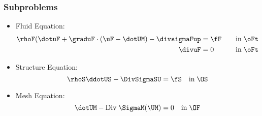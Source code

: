 \begin{frame}
 \frametitle{Subproblems}
   \begin{itemize}[<+->]
  \item
    Fluid Equation:
    \begin{equation*}
      \begin{aligned}
        \rhoF(\dotuF + \graduF \cdot (\uF - \dotUM) - \divsigmaFup &= \fF \quad &\textrm{in}\; \oFt \\
        \divuF &= 0 \quad  &\textrm{in} \;\oFt
      \end{aligned}
    \end{equation*}
    
   \item
    Structure Equation:
    \begin{equation*}
      \rhoS\ddotUS - \DivSigmaSU =  \fS \quad \textrm{in}\;
      \OS 
    \end{equation*}
    
  \item
    Mesh Equation:
    \begin{equation*}
      \dotUM- \textrm{Div} \; \SigmaM(\UM) =
      0 \quad \textrm{in}\;\OF
    \end{equation*}
    \end{itemize}

\end{frame}
